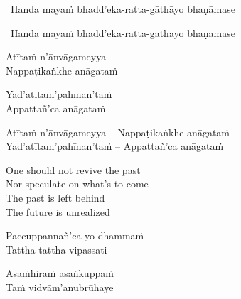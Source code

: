 \ifninebythirteen

\begin{leader}
  \anglebracketleft\ \hspace{-0.5mm}Handa mayaṁ bhadd'eka-ratta-gāthāyo \mbox{bhaṇāmase}~\hspace{-0.5mm}\anglebracketright\
\end{leader}

\else 

\begin{leader}
  \anglebracketleft\ \hspace{-0.5mm}Handa mayaṁ bhadd'eka-ratta-gāthāyo bhaṇāmase \hspace{-0.5mm}\anglebracketright\
\end{leader}

\fi

\ifninebythirteen

\begin{pali-hang-verses}
  Atītaṁ n'ānvāgameyya\\
  Nappaṭikaṅkhe anāgataṁ
\end{pali-hang-verses}
\begin{pali-hang-together}
  Yad'atītam'pahīnan'taṁ\\
  Appattañ'ca anāgataṁ
\end{pali-hang-together}

\else

\begin{verses}
  Atītaṁ n'ānvāgameyya – Nappaṭikaṅkhe anāgataṁ\\
  Yad'atītam'pahīnan'taṁ – Appattañ'ca anāgataṁ
\end{verses}

\fi

\begin{english-verses}
  One should not revive the past\\
  Nor speculate on what's to come\\
  The past is left behind\\
  The future is unrealized
\end{english-verses}


\ifninebythirteen

\begin{pali-hang-verses}
  Paccuppannañ'ca yo dhammaṁ\\
  Tattha tattha vipassati
\end{pali-hang-verses}
\begin{pali-hang-together}
  Asaṁhiraṁ asaṅkuppaṁ\\
  Taṁ vidvā\ifdigital\makeatletter\hyperlink{endnote156-appendix}\fi m'anubrūhaye
\end{pali-hang-together}

